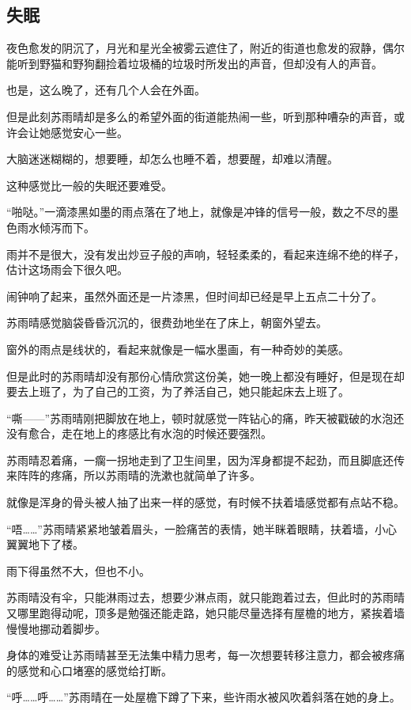 \subsection{失眠}

夜色愈发的阴沉了，月光和星光全被雾云遮住了，附近的街道也愈发的寂静，偶尔能听到野猫和野狗翻捡着垃圾桶的垃圾时所发出的声音，但却没有人的声音。

也是，这么晚了，还有几个人会在外面。

但是此刻苏雨晴却是多么的希望外面的街道能热闹一些，听到那种嘈杂的声音，或许会让她感觉安心一些。

大脑迷迷糊糊的，想要睡，却怎么也睡不着，想要醒，却难以清醒。

这种感觉比一般的失眠还要难受。

“啪哒。”一滴漆黑如墨的雨点落在了地上，就像是冲锋的信号一般，数之不尽的墨色雨水倾泻而下。

雨并不是很大，没有发出炒豆子般的声响，轻轻柔柔的，看起来连绵不绝的样子，估计这场雨会下很久吧。

闹钟响了起来，虽然外面还是一片漆黑，但时间却已经是早上五点二十分了。

苏雨晴感觉脑袋昏昏沉沉的，很费劲地坐在了床上，朝窗外望去。

窗外的雨点是线状的，看起来就像是一幅水墨画，有一种奇妙的美感。

但是此时的苏雨晴却没有那份心情欣赏这份美，她一晚上都没有睡好，但是现在却要去上班了，为了自己的工资，为了养活自己，她只能起床去上班了。

“嘶——”苏雨晴刚把脚放在地上，顿时就感觉一阵钻心的痛，昨天被戳破的水泡还没有愈合，走在地上的疼感比有水泡的时候还要强烈。

苏雨晴忍着痛，一瘸一拐地走到了卫生间里，因为浑身都提不起劲，而且脚底还传来阵阵的疼痛，所以苏雨晴的洗漱也就简单了许多。

就像是浑身的骨头被人抽了出来一样的感觉，有时候不扶着墙感觉都有点站不稳。

“唔……”苏雨晴紧紧地皱着眉头，一脸痛苦的表情，她半眯着眼睛，扶着墙，小心翼翼地下了楼。

雨下得虽然不大，但也不小。

苏雨晴没有伞，只能淋雨过去，想要少淋点雨，就只能跑着过去，但此时的苏雨晴又哪里跑得动呢，顶多是勉强还能走路，她只能尽量选择有屋檐的地方，紧挨着墙慢慢地挪动着脚步。

身体的难受让苏雨晴甚至无法集中精力思考，每一次想要转移注意力，都会被疼痛的感觉和心口堵塞的感觉给打断。

“呼……呼……”苏雨晴在一处屋檐下蹲了下来，些许雨水被风吹着斜落在她的身上。


